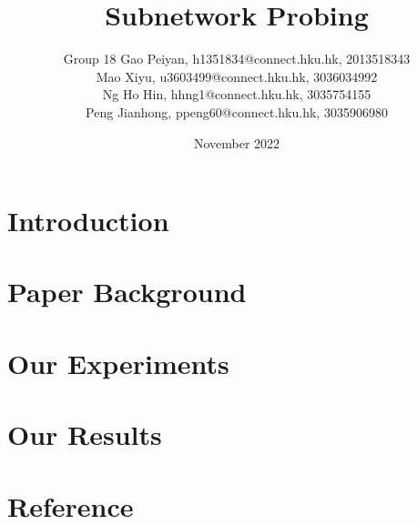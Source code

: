 \documentclass{article}
\title{Subnetwork Probing}
\author{Group 18
Gao Peiyan, h1351834@connect.hku.hk, 2013518343  \\
Mao Xiyu, u3603499@connect.hku.hk, 3036034992 \\
Ng Ho Hin, hhng1@connect.hku.hk, 3035754155 \\
Peng Jianhong, ppeng60@connect.hku.hk, 3035906980 \\ 
}
\date{November 2022}
\begin{document}
\maketitle

\section{Introduction}

\section{Paper Background}

\section{Our Experiments}

\section{Our Results}

\section{Reference}
\end{document}
